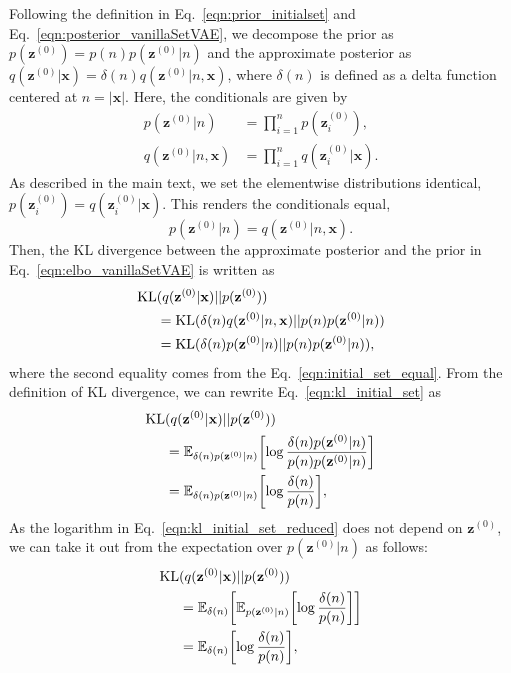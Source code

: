 \documentclass[final]{arxiv/cvpr}
\begin{document}
Following the definition in Eq.~\eqref{eqn:prior_initialset} and Eq.~\eqref{eqn:posterior_vanillaSetVAE}, we decompose the prior as $p(\mathbf{z}^{(0)}) = p(n)p(\mathbf{z}^{(0)}|n)$ and the approximate posterior as $q(\mathbf{z}^{(0)}|\mathbf{x}) = \delta(n)q(\mathbf{z}^{(0)}|n, \mathbf{x})$, where $\delta(n)$ is defined as a delta function centered at $n=|\mathbf{x}|$.
Here, the conditionals are given by
\begin{align}
     p(\mathbf{z}^{(0)}|n) &= \prod_{i=1}^n{p(\mathbf{z}_i^{(0)})}, \\
     q(\mathbf{z}^{(0)}|n, \mathbf{x}) &= \prod_{i=1}^n{q(\mathbf{z}_i^{(0)}|\mathbf{x})}.
\end{align}
As described in the main text, we set the elementwise distributions identical, $p(\mathbf{z}_i^{(0)}) = q(\mathbf{z}_i^{(0)}|\mathbf{x})$.
This renders the conditionals equal,
\begin{equation}
    p(\mathbf{z}^{(0)}|n) = q(\mathbf{z}^{(0)}|n, \mathbf{x}).\label{eqn:initial_set_equal}
\end{equation}
Then, the KL divergence between the approximate posterior and the prior in Eq.~\eqref{eqn:elbo_vanillaSetVAE} is written as
\begin{align}
    \textnormal{KL}&(q(\mathbf{z}^{(0)}|\mathbf{x})||p(\mathbf{z}^{(0)})) \nonumber\\
    &= \textnormal{KL}(\delta(n)q(\mathbf{z}^{(0)}|n, \mathbf{x})||p(n)p(\mathbf{z}^{(0)}|n)) \\
    &= \textnormal{KL}(\delta(n)p(\mathbf{z}^{(0)}|n)||p(n)p(\mathbf{z}^{(0)}|n)), \label{eqn:kl_initial_set}
\end{align}
where the second equality comes from the Eq.~\eqref{eqn:initial_set_equal}.
From the definition of KL divergence, we can rewrite Eq.~\eqref{eqn:kl_initial_set} as
\begin{align}
    \textnormal{KL}&(q(\mathbf{z}^{(0)}|\mathbf{x})||p(\mathbf{z}^{(0)})) \nonumber\\
    &= \mathbb{E}_{\delta(n)p(\mathbf{z}^{(0)}|n)}{\left[\log{\frac{\delta(n)p(\mathbf{z}^{(0)}|n)}{p(n)p(\mathbf{z}^{(0)}|n)}}\right]} \\
    &= \mathbb{E}_{\delta(n)p(\mathbf{z}^{(0)}|n)}{\left[\log{\frac{\delta(n)}{p(n)}}\right]}, \label{eqn:kl_initial_set_reduced}
\end{align}
As the logarithm in Eq.~\eqref{eqn:kl_initial_set_reduced} does not depend on $\mathbf{z}^{(0)}$, we can take it out from the expectation over $p(\mathbf{z}^{(0)}|n)$ as follows:
\begin{align}
    \textnormal{KL}&(q(\mathbf{z}^{(0)}|\mathbf{x})||p(\mathbf{z}^{(0)})) \nonumber\\
    &= \mathbb{E}_{\delta(n)}{\left[\mathbb{E}_{p(\mathbf{z}^{(0)}|n)} {\left[\log{\frac{\delta(n)}{p(n)}}\right]}\right]} \\
    &= \mathbb{E}_{\delta(n)}{\left[\log{\frac{\delta(n)}{p(n)}}\right]}, \label{eqn:kl_initial_set_cardinality}
\end{align}
\end{document}
